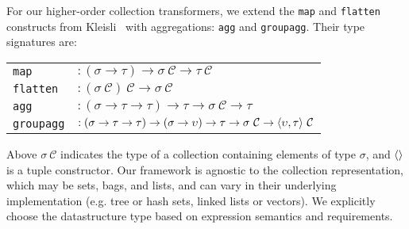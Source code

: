 For our higher-order collection transformers, we extend the \texttt{map} and
\texttt{flatten} constructs from Kleisli~ with aggregations:
\texttt{agg} and \texttt{groupagg}. Their type signatures are:


\vspace{1mm}\hspace{-4mm}
\begin{tabular}{p{1cm}l}
\texttt{map}
    & $: (\sigma \rightarrow \tau)
           \rightarrow \sigma \ \mathcal{C}
           \rightarrow \tau \ \mathcal{C}$\\
\texttt{flatten}       
    & $: (\sigma\ \mathcal{C}) \ \mathcal{C}
           \rightarrow \sigma \ \mathcal{C}$ \\
\texttt{agg}
    & $: (\sigma \rightarrow \tau \rightarrow \tau)
           \rightarrow \tau
           \rightarrow \sigma \ \mathcal{C}
           \rightarrow \tau$ \\
\texttt{groupagg}
    & $: (\sigma \rightarrow \tau \rightarrow \tau)
           \rightarrow (\sigma \rightarrow \upsilon)
           \rightarrow \tau
           \rightarrow \sigma \ \mathcal{C}
           \rightarrow {\langle\upsilon, \tau\rangle} \ \mathcal{C}$ \\
\end{tabular}



\vspace{1mm}
\noindent Above $\sigma \ \mathcal{C}$ indicates the type of a collection
containing elements of type $\sigma$, and ${\langle\rangle}$ is a tuple constructor. Our
framework is agnostic to the collection representation, which may be sets, bags,
and lists, and can vary in their underlying implementation (e.g. tree or
hash sets, linked lists or vectors). We explicitly choose the datastructure type
based on expression semantics and requirements.







